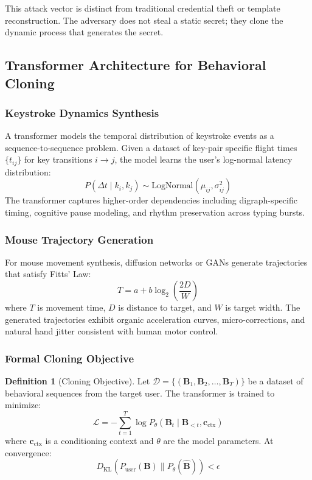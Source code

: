 \documentclass[11pt,twoside]{amsart}
\theoremstyle{plain}
\theoremstyle{definition}
\newtheorem{definition}[theorem]{Definition}
\theoremstyle{remark}
\newcommand{\bB}{\mathbf{B}}
\begin{document}
This attack vector is distinct from traditional credential theft or template reconstruction. The adversary does not steal a static secret; they clone the dynamic process that generates the secret.

\subsection{Transformer Architecture for Behavioral Cloning}

\subsubsection{Keystroke Dynamics Synthesis}

A transformer models the temporal distribution of keystroke events as a sequence-to-sequence problem. Given a dataset of key-pair specific flight times $\{t_{ij}\}$ for key transitions $i \rightarrow j$, the model learns the user's log-normal latency distribution:
\begin{equation}
P(\Delta t \mid k_i, k_j) \sim \text{LogNormal}(\mu_{ij}, \sigma_{ij}^2)
\end{equation}
The transformer captures higher-order dependencies including digraph-specific timing, cognitive pause modeling, and rhythm preservation across typing bursts.

\subsubsection{Mouse Trajectory Generation}

For mouse movement synthesis, diffusion networks or GANs generate trajectories that satisfy Fitts' Law:
\begin{equation}
T = a + b \log_2\left(\frac{2D}{W}\right)
\end{equation}
where $T$ is movement time, $D$ is distance to target, and $W$ is target width. The generated trajectories exhibit organic acceleration curves, micro-corrections, and natural hand jitter consistent with human motor control.

\subsubsection{Formal Cloning Objective}

\begin{definition}[Cloning Objective]
\label{def:cloning}
Let $\mathcal{D} = \{(\bB_1, \bB_2, \ldots, \bB_T)\}$ be a dataset of behavioral sequences from the target user. The transformer is trained to minimize:
\begin{equation}
\mathcal{L} = -\sum_{t=1}^{T} \log P_\theta(\bB_t \mid \bB_{<t}, \mathbf{c}_{\text{ctx}})
\end{equation}
where $\mathbf{c}_{\text{ctx}}$ is a conditioning context and $\theta$ are the model parameters. At convergence:
\begin{equation}
D_{\text{KL}}(P_{\text{user}}(\bB) \| P_\theta(\hat{\bB})) < \epsilon
\end{equation}
\end{definition}
\end{document}
